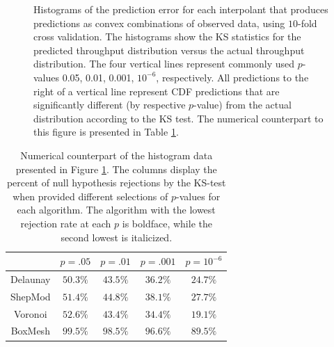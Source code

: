 \documentclass[smallextended,final]{svjour3}  %
\begin{document}
\begin{figure}
  \centering
  \caption{Histograms of the prediction error for each interpolant
    that produces predictions as convex combinations of observed data,
    using $10$-fold cross validation. The histograms show the KS
    statistics for the predicted throughput distribution versus the
    actual throughput distribution. The four vertical lines represent
    commonly used $p$-values 0.05, 0.01, 0.001, $10^{-6}$,
    respectively. All predictions to the right of a vertical line
    represent CDF predictions that are significantly different (by
    respective $p$-value) from the actual distribution according to
    the KS test. The numerical counterpart to this figure is presented
    in Table \ref{table:null-hypothesis-results}.}
  \label{fig:throughput-prediction}
\end{figure}

\begin{table}
  \renewcommand{\arraystretch}{1.3}
  \centering
  \begin{tabular}{c|c|c|c|c}
     & $p = .05$ & $p = .01$ & $p = .001$ & $p = 10^{-6}$\\
    \hline
    Delaunay & $\mathbf{50.3}\%$ & $\mathit{43.5}\%$ & $\mathit{36.2}\%$ & $\mathit{24.7}\%$\\
    ShepMod & $\mathit{51.4}\%$ & $44.8\%$ & $38.1\%$ & $27.7\%$\\
    Voronoi & $52.6\%$ & $\mathbf{43.4}\%$ & $\mathbf{34.4}\%$ & $\mathbf{19.1}\%$\\
    BoxMesh & $99.5\%$ & $98.5\%$ & $96.6\%$ & $89.5\%$\\
  \end{tabular}
  \caption{Numerical counterpart of the histogram data presented in
    Figure \ref{fig:throughput-prediction}. The columns display the
    percent of null hypothesis rejections by the KS-test when provided
    different selections of $p$-values for each algorithm. The
    algorithm with the lowest rejection rate at each $p$ is boldface,
    while the second lowest is italicized.}
  \label{table:null-hypothesis-results}
\end{table}
\end{document}
